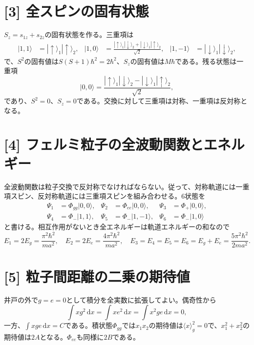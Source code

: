 \documentclass[11pt,a4paper]{article}
\begin{document}
\section*{[3] 全スピンの固有状態}
$S_z=s_{1z}+s_{2z}$の固有状態を作る。三重項は
\begin{align}
 |1,1\rangle&=|\uparrow\rangle_1|\uparrow\rangle_2,&
 |1,0\rangle&=\frac{|\uparrow\rangle_1|\downarrow\rangle_2+|\downarrow\rangle_1|\uparrow\rangle_2}{\sqrt2},&
 |1,-1\rangle&=|\downarrow\rangle_1|\downarrow\rangle_2,
\end{align}
で、$S^2$の固有値は$S(S+1)\hbar^2=2\hbar^2$、$S_z$の固有値は$M\hbar$である。残る状態は一重項
\begin{equation}
 |0,0\rangle=\frac{|\uparrow\rangle_1|\downarrow\rangle_2-|\downarrow\rangle_1|\uparrow\rangle_2}{\sqrt2},
\end{equation}
であり、$S^2=0$、$S_z=0$である。交換に対して三重項は対称、一重項は反対称となる。

\section*{[4] フェルミ粒子の全波動関数とエネルギー}
全波動関数は粒子交換で反対称でなければならない。従って、対称軌道には一重項スピン、反対称軌道には三重項スピンを組み合わせる。6状態を
\begin{align}
 \Psi_1&=\Phi_{gg}|0,0\rangle,&
 \Psi_2&=\Phi_{ee}|0,0\rangle,&
 \Psi_3&=\Phi_+|0,0\rangle,\\
 \Psi_4&=\Phi_-|1,1\rangle,&
 \Psi_5&=\Phi_-|1,-1\rangle,&
 \Psi_6&=\Phi_-|1,0\rangle
\end{align}
と書ける。相互作用がないとき全エネルギーは軌道エネルギーの和なので
\begin{equation}
 E_1=2E_g=\frac{\pi^2\hbar^2}{ma^2},\quad
 E_2=2E_e=\frac{4\pi^2\hbar^2}{ma^2},\quad
 E_3=E_4=E_5=E_6=E_g+E_e=\frac{5\pi^2\hbar^2}{2ma^2}.
\end{equation}

\section*{[5] 粒子間距離の二乗の期待値}
井戸の外で$g=e=0$として積分を全実数に拡張してよい。偶奇性から
\begin{equation}
 \int xg^2\,\mathrm{d}x=\int xe^2\,\mathrm{d}x=\int x^2ge\,\mathrm{d}x=0,
\end{equation}
一方、$\int xge\,\mathrm{d}x=C$である。積状態$\Phi_{gg}$では$x_1x_2$の期待値は$\langle x\rangle_g^2=0$で、$x_1^2+x_2^2$の期待値は$2A$となる。$\Phi_{ee}$も同様に$2B$である。
\end{document}

